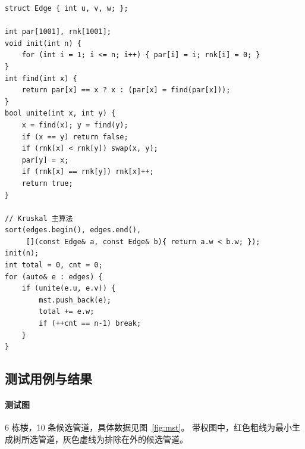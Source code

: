 \documentclass[12pt, a4paper]{ctexart}
\begin{document}
\begin{lstlisting}[caption={并查集 + Kruskal 主逻辑}]
struct Edge { int u, v, w; };

int par[1001], rnk[1001];
void init(int n) {
    for (int i = 1; i <= n; i++) { par[i] = i; rnk[i] = 0; }
}
int find(int x) {
    return par[x] == x ? x : (par[x] = find(par[x]));
}
bool unite(int x, int y) {
    x = find(x); y = find(y);
    if (x == y) return false;
    if (rnk[x] < rnk[y]) swap(x, y);
    par[y] = x;
    if (rnk[x] == rnk[y]) rnk[x]++;
    return true;
}

// Kruskal 主算法
sort(edges.begin(), edges.end(),
     [](const Edge& a, const Edge& b){ return a.w < b.w; });
init(n);
int total = 0, cnt = 0;
for (auto& e : edges) {
    if (unite(e.u, e.v)) {
        mst.push_back(e);
        total += e.w;
        if (++cnt == n-1) break;
    }
}
\end{lstlisting}

\subsection{测试用例与结果}

\paragraph{测试图}

6 栋楼，10 条候选管道，具体数据见图~\ref{fig:mst}。
带权图中，红色粗线为最小生成树所选管道，灰色虚线为排除在外的候选管道。
\end{document}

